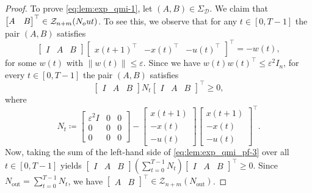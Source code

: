 \documentclass[10pt,a4paper]{amsart}
\newcommand{\norm}[1]{\left\|#1\right\|}
\begin{document}
\begin{proof}
To prove \eqref{eq:lem:exp_qmi-1}, let $(A,B)\in\Sigma_\mathcal{D}$. We claim that $\begin{bmatrix}
A & B
\end{bmatrix}^\top\in\mathcal{Z}_{n+m}(N_\textup{out})$. To see this, we observe that for any $t\in[0,T-1]$ the pair $(A,B)$ satisfies
\begin{equation}
\label{eq:lem:exp_qmi_pf-1}
\begin{bmatrix}
I & A & B
\end{bmatrix}\begin{bmatrix}
x(t+1)^\top &
-x(t)^\top &
-u(t)^\top
\end{bmatrix}^\top=-w(t),
\end{equation}
for some $w(t)$ with $\norm{w(t)}\leq\varepsilon$. Since we have \mbox{$w(t)w(t)^\top \leq \varepsilon^2 I_n$}, for every $t\in[0,T-1]$ the pair $(A,B)$ satisfies
\begin{equation}
\label{eq:lem:exp_qmi_pf-3}
\begin{bmatrix}
I & A & B
\end{bmatrix} N_t\begin{bmatrix}
I & A & B
\end{bmatrix}^\top\geq 0,
\end{equation}
where 
\begin{equation}
N_t\coloneqq\begin{bmatrix}
\varepsilon^2 I & 0 & 0 \\
0 & 0 & 0 \\
0 & 0 & 0
\end{bmatrix}-\begin{bmatrix}
x(t+1) \\
-x(t) \\
-u(t)
\end{bmatrix}\begin{bmatrix}
x(t+1) \\
-x(t) \\
-u(t)
\end{bmatrix}^\top.
\end{equation}
Now, taking the sum of the left-hand side of \eqref{eq:lem:exp_qmi_pf-3} over all \mbox{$t\in[0,T-1]$} yields \mbox{$\begin{bmatrix}
I \!&\! A \!&\! B
\end{bmatrix}(\textstyle{\sum_{t=0}^{T-1}N_t})\begin{bmatrix}
I \!&\! A \!&\! B
\end{bmatrix}^\top\!\geq\! 0$}. Since $N_\text{out}\!=\!\sum_{t=0}^{T-1} N_t$, we have \mbox{$\begin{bmatrix}
A \!&\! B
\end{bmatrix}^\top\!\in\!\mathcal{Z}_{n+m}(N_\text{out})$}. 
\end{proof}
\end{document}
